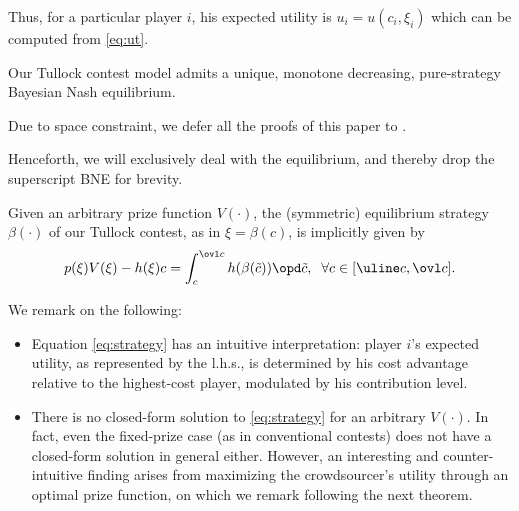 \documentclass{sig-alternate-10pt}
\begin{document}
Thus, for a particular player $i$, his expected utility is $u_i=u(c_i,\xi_i)$ which can be computed from \eqref{eq:ut}.

\begin{prop}\label{thm:exists}
Our Tullock contest model admits a unique, monotone decreasing, pure-strategy Bayesian Nash equilibrium.
\end{prop}
Due to space constraint, we defer all the proofs of this paper to \cite{infocom15appendix}.

Henceforth, we will exclusively deal with the equilibrium, and thereby drop the superscript BNE for brevity.

\begin{lem}\label{lem:strategy}
Given an arbitrary prize function $V(\cdot)$, the (symmetric) equilibrium strategy $\beta(\cdot)$ of our Tullock contest, as in $\xi=\beta(c)$, is implicitly given by
\begin{align}\label{eq:strategy}
p(\xi) V(\xi) - h(\xi) c = \int_{c}^{\ovl c} h(\beta(\tilde c)) \opd \tilde c,\;\;
\forall c\in[\uline c,\ovl c].
\end{align}
\end{lem}
We remark on the following:
\begin{itemize}[leftmargin=0.8em]
\item Equation \eqref{eq:strategy} has an intuitive interpretation: player $i$'s expected utility, as represented by the l.h.s., is determined by his cost advantage relative to the highest-cost player, modulated by his contribution level.
\item There is no closed-form solution to \eqref{eq:strategy} for an arbitrary $V(\cdot)$. In fact, even the fixed-prize case (as in conventional contests) does not have a closed-form solution in general either\cite{Konrad09book}. However, an interesting and counter-intuitive finding arises from maximizing the crowdsourcer's utility through an optimal prize function, on which we remark following the next theorem.
\end{itemize}
\end{document}
